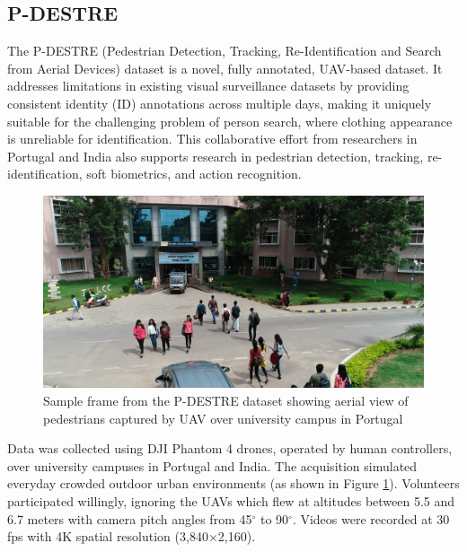 \subsection{P-DESTRE}
\label{sec:pdestre}

The P-DESTRE (Pedestrian Detection, Tracking, Re-Identification and Search from Aerial Devices) dataset \cite{kumar2020pdestrefullyannotateddataset} is a novel, fully annotated, UAV-based dataset. It addresses limitations in existing visual surveillance datasets by providing consistent identity (ID) annotations across multiple days, making it uniquely suitable for the challenging problem of person search, where clothing appearance is unreliable for identification. This collaborative effort from researchers in Portugal and India also supports research in pedestrian detection, tracking, re-identification, soft biometrics, and action recognition.

\begin{figure}[htbp]
    \centering
    \includegraphics[width=1\textwidth]{Figure/pdestre.png}
    \caption{Sample frame from the P-DESTRE dataset showing aerial view of pedestrians captured by UAV over university campus in Portugal}
    \label{fig:pdestre_overview}
\end{figure}

Data was collected using DJI Phantom 4 drones, operated by human controllers, over university campuses in Portugal and India. The acquisition simulated everyday crowded outdoor urban environments (as shown in Figure \ref{fig:pdestre_overview}). Volunteers participated willingly, ignoring the UAVs which flew at altitudes between 5.5 and 6.7 meters with camera pitch angles from 45$^\circ$ to 90$^\circ$. Videos were recorded at 30 fps with 4K spatial resolution (3,840$\times$2,160).

